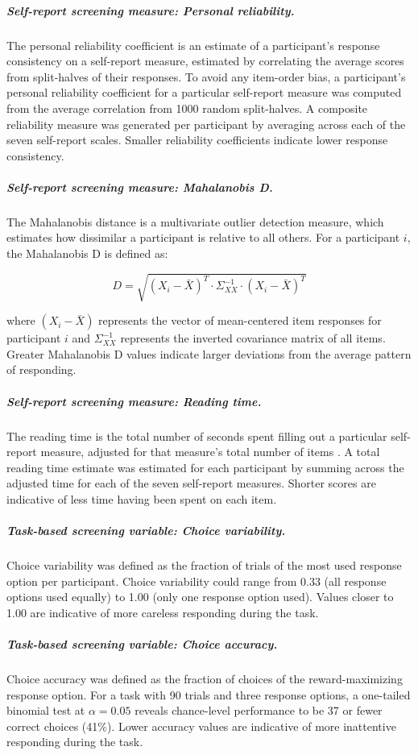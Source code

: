 \documentclass[a4paper,notitlepage,12pt]{article}
\begin{document}
\begin{refsection}[main]
\subparagraph{Self-report screening measure: Personal reliability.} The personal reliability coefficient is an estimate of a participant's response consistency on a self-report measure, estimated by correlating the average scores from split-halves of their responses. To avoid any item-order bias, a participant's personal reliability coefficient for a particular self-report measure was computed from the average correlation from 1000 random split-halves. A composite reliability measure was generated per participant by averaging across each of the seven self-report scales. Smaller reliability coefficients indicate lower response consistency.  

\subparagraph{Self-report screening measure: Mahalanobis D.} The Mahalanobis distance is a multivariate outlier detection measure, which estimates how dissimilar a participant is relative to all others. For a participant $i$, the Mahalanobis D is defined as:

\begin{equation*}
    D = \sqrt{(X_i - \bar{X})^T \cdot \Sigma^{-1}_{XX} \cdot (X_i - \bar{X})^T }
\end{equation*}

where $(X_i - \bar{X})$ represents the vector of mean-centered item responses for participant $i$ and $\Sigma^{-1}_{XX}$ represents the inverted covariance matrix of all items. Greater Mahalanobis D values indicate larger deviations from the average pattern of responding.

\subparagraph{Self-report screening measure: Reading time.} The reading time is the total number of seconds spent filling out a particular self-report measure, adjusted for that measure's total number of items \cite{ophir2020turker}. A total reading time estimate was estimated for each participant by summing across the adjusted time for each of the seven self-report measures. Shorter scores are indicative of less time having been spent on each item.

\subparagraph{Task-based screening variable: Choice variability.} Choice variability was defined as the fraction of trials of the most used response option per participant. Choice variability could range from 0.33 (all response options used equally) to 1.00 (only one response option used). Values closer to 1.00 are indicative of more careless responding during the task.  

\subparagraph{Task-based screening variable: Choice accuracy.} Choice accuracy was defined as the fraction of choices of the reward-maximizing response option. For a task with 90 trials and three response options, a one-tailed binomial test at $\alpha=0.05$ reveals chance-level performance to be 37 or fewer correct choices (41\%). Lower accuracy values are indicative of more inattentive responding during the task.


\end{refsection}
\end{document}
